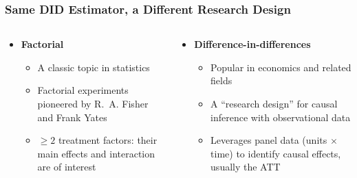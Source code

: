 \documentclass[xcolor=svgnames,9pt,english, aspectratio=169]{beamer}
\begin{document}
\begin{frame}
  \frametitle{Same DID Estimator, a Different Research Design}
\begin{center}
\end{center}
\bigskip
\begin{columns}[T,onlytextwidth]
\begin{column}{0.48\textwidth}
\begin{itemize}\itemsep0.5em
\item \textbf{Factorial}
\begin{itemize}\itemsep0.4em
  \item A classic topic in statistics
  \item Factorial experiments pioneered by R.~A. Fisher and Frank Yates
  \item $\geq 2$ treatment factors: their main effects and interaction are of interest
\end{itemize}
\end{itemize}
\end{column}
\begin{column}{0.48\textwidth}
\begin{itemize}\itemsep0.5em
\item<2-> \textbf{Difference-in-differences}
\begin{itemize}\itemsep0.4em
  \item<2-> Popular in economics and related fields
  \item<2-> A ``research design'' for causal inference with observational data
  \item<2-> Leverages panel data (units $\times$ time) to identify causal effects, usually the ATT
\end{itemize}
\end{itemize}
\end{column}
\end{columns}
\end{frame}
\end{document}
